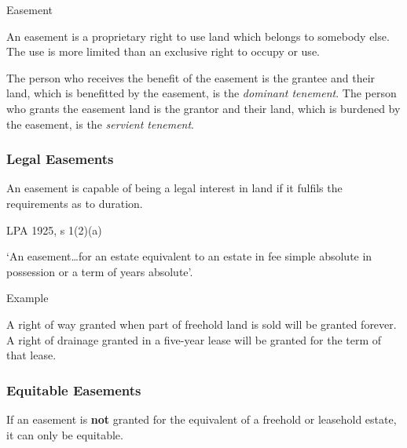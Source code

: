 \documentclass[
]{article}
\newenvironment{env-9843ce55-0506-497d-95ba-03a690b05b3c}
{
    \savenotes\tcolorbox[blanker,breakable,left=5pt,borderline west={2pt}{-4pt}{green}]
}
{
    \endtcolorbox\spewnotes
}
\newenvironment{env-615494ee-4c11-425d-a24a-676608cc22a4}
{
    \savenotes\tcolorbox[blanker,breakable,left=5pt,borderline west={2pt}{-4pt}{gold}]
}
{
    \endtcolorbox\spewnotes
}
\newenvironment{env-de3101d4-f08b-48eb-bc0e-2fa06f3bcf8e}
{
    \savenotes\tcolorbox[blanker,breakable,left=5pt,borderline west={2pt}{-4pt}{purple}]
}
{
    \endtcolorbox\spewnotes
}
\begin{document}
\begin{env-615494ee-4c11-425d-a24a-676608cc22a4}

Easement

An easement is a proprietary right to use land which belongs to somebody
else. The use is more limited than an exclusive right to occupy or use.

\end{env-615494ee-4c11-425d-a24a-676608cc22a4}

The person who receives the benefit of the easement is the grantee and
their land, which is benefitted by the easement, is the \emph{dominant
tenement}. The person who grants the easement land is the grantor and
their land, which is burdened by the easement, is the \emph{servient
tenement}.

\hypertarget{legal-easements}{%
\subsubsection{Legal Easements}\label{legal-easements}}

An easement is capable of being a legal interest in land if it fulfils
the requirements as to duration.

\begin{env-9843ce55-0506-497d-95ba-03a690b05b3c}

LPA 1925, s 1(2)(a)

`An easement\ldots for an estate equivalent to an estate in fee simple
absolute in possession or a term of years absolute'.

\end{env-9843ce55-0506-497d-95ba-03a690b05b3c}

\begin{env-de3101d4-f08b-48eb-bc0e-2fa06f3bcf8e}

Example

A right of way granted when part of freehold land is sold will be
granted forever. A right of drainage granted in a five-year lease will
be granted for the term of that lease.

\end{env-de3101d4-f08b-48eb-bc0e-2fa06f3bcf8e}

\hypertarget{equitable-easements}{%
\subsubsection{Equitable Easements}\label{equitable-easements}}

If an easement is \textbf{not} granted for the equivalent of a freehold
or leasehold estate, it can only be equitable.
\end{document}
